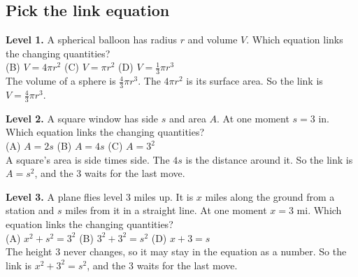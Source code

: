 \documentclass[11pt]{article}
\begin{document}
\subsection*{Pick the link equation}
\noindent\textbf{Level 1.} A spherical balloon has radius $r$ and volume $V$. Which equation links the changing quantities?\\  \quad (B) $V=4\pi r^2$ \quad (C) $V=\pi r^2$ \quad (D) $V=\tfrac13\pi r^3$\\  \quad The volume of a sphere is $\tfrac43\pi r^3$. The $4\pi r^2$ is its surface area. So the link is $V=\tfrac43\pi r^3$.\par\medskip
\noindent\textbf{Level 2.} A square window has side $s$ and area $A$. At one moment $s=3$ in. Which equation links the changing quantities?\\ (A) $A=2s$ \quad (B) $A=4s$ \quad (C) $A=3^2$ \quad {}\\  \quad A square's area is side times side. The $4s$ is the distance around it. So the link is $A=s^2$, and the 3 waits for the last move.\par\medskip
\noindent\textbf{Level 3.} A plane flies level 3 miles up. It is $x$ miles along the ground from a station and $s$ miles from it in a straight line. At one moment $x=3$ mi. Which equation links the changing quantities?\\ (A) $x^2+s^2=3^2$ \quad (B) $3^2+3^2=s^2$ \quad {} \quad (D) $x+3=s$\\  \quad The height 3 never changes, so it may stay in the equation as a number. So the link is $x^2+3^2=s^2$, and the 3 waits for the last move.\par\medskip
\end{document}
